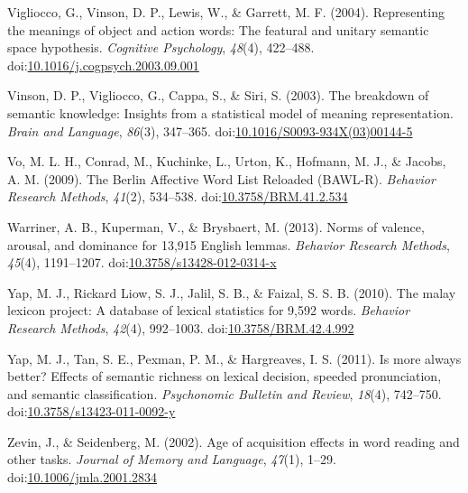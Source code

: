 \documentclass[english,man]{apa6}
\theoremstyle{definition}
\theoremstyle{definition}
\theoremstyle{definition}
\theoremstyle{remark}
\begin{document}
\hypertarget{ref-Vigliocco2004}{}
Vigliocco, G., Vinson, D. P., Lewis, W., \& Garrett, M. F. (2004).
Representing the meanings of object and action words: The featural and
unitary semantic space hypothesis. \emph{Cognitive Psychology},
\emph{48}(4), 422--488.
doi:\href{https://doi.org/10.1016/j.cogpsych.2003.09.001}{10.1016/j.cogpsych.2003.09.001}

\hypertarget{ref-Vinson2003}{}
Vinson, D. P., Vigliocco, G., Cappa, S., \& Siri, S. (2003). The
breakdown of semantic knowledge: Insights from a statistical model of
meaning representation. \emph{Brain and Language}, \emph{86}(3),
347--365.
doi:\href{https://doi.org/10.1016/S0093-934X(03)00144-5}{10.1016/S0093-934X(03)00144-5}

\hypertarget{ref-Vo2009}{}
Vo, M. L. H., Conrad, M., Kuchinke, L., Urton, K., Hofmann, M. J., \&
Jacobs, A. M. (2009). The Berlin Affective Word List Reloaded (BAWL-R).
\emph{Behavior Research Methods}, \emph{41}(2), 534--538.
doi:\href{https://doi.org/10.3758/BRM.41.2.534}{10.3758/BRM.41.2.534}

\hypertarget{ref-Warriner2013}{}
Warriner, A. B., Kuperman, V., \& Brysbaert, M. (2013). Norms of
valence, arousal, and dominance for 13,915 English lemmas.
\emph{Behavior Research Methods}, \emph{45}(4), 1191--1207.
doi:\href{https://doi.org/10.3758/s13428-012-0314-x}{10.3758/s13428-012-0314-x}

\hypertarget{ref-Yap2010}{}
Yap, M. J., Rickard Liow, S. J., Jalil, S. B., \& Faizal, S. S. B.
(2010). The malay lexicon project: A database of lexical statistics for
9,592 words. \emph{Behavior Research Methods}, \emph{42}(4), 992--1003.
doi:\href{https://doi.org/10.3758/BRM.42.4.992}{10.3758/BRM.42.4.992}

\hypertarget{ref-Yap2011}{}
Yap, M. J., Tan, S. E., Pexman, P. M., \& Hargreaves, I. S. (2011). Is
more always better? Effects of semantic richness on lexical decision,
speeded pronunciation, and semantic classification. \emph{Psychonomic
Bulletin and Review}, \emph{18}(4), 742--750.
doi:\href{https://doi.org/10.3758/s13423-011-0092-y}{10.3758/s13423-011-0092-y}

\hypertarget{ref-Zevin2002}{}
Zevin, J., \& Seidenberg, M. (2002). Age of acquisition effects in word
reading and other tasks. \emph{Journal of Memory and Language},
\emph{47}(1), 1--29.
doi:\href{https://doi.org/10.1006/jmla.2001.2834}{10.1006/jmla.2001.2834}
\end{document}
